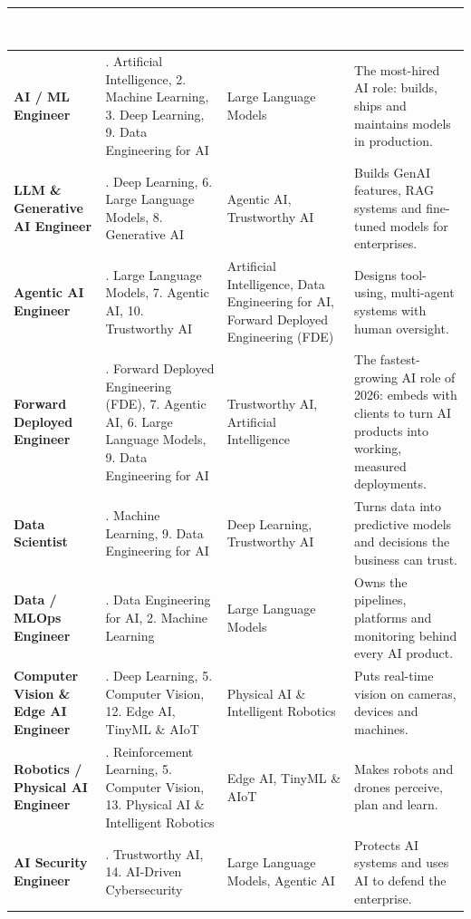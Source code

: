 \documentclass[10pt,a4paper]{article}
\newcommand{\hdr}{\rowcolor{navy}}
\newcommand{\hw}[1]{\textcolor{white}{\bfseries #1}}
\begin{document}
{\small\begin{longtable}{@{}>{\raggedright\arraybackslash}p{3.3cm}>{\raggedright\arraybackslash}p{4.8cm}>{\raggedright\arraybackslash}p{2.8cm}>{\raggedright\arraybackslash}p{4.6cm}@{}}\hdr\hw{Target role}&\hw{Core courses}&\hw{Recommended extras}&\hw{Why it matters}\\\endhead
\textbf{AI / ML Engineer} & 1. Artificial Intelligence, 2. Machine Learning, 3. Deep Learning, 9. Data Engineering for AI & Large Language Models & The most-hired AI role: builds, ships and maintains models in production.\\
\rowcolor{rowbg}\textbf{LLM \& Generative AI Engineer} & 3. Deep Learning, 6. Large Language Models, 8. Generative AI & Agentic AI, Trustworthy AI & Builds GenAI features, RAG systems and fine-tuned models for enterprises.\\
\textbf{Agentic AI Engineer} & 6. Large Language Models, 7. Agentic AI, 10. Trustworthy AI & Artificial Intelligence, Data Engineering for AI, Forward Deployed Engineering (FDE) & Designs tool-using, multi-agent systems with human oversight.\\
\rowcolor{rowbg}\textbf{Forward Deployed Engineer} & 16. Forward Deployed Engineering (FDE), 7. Agentic AI, 6. Large Language Models, 9. Data Engineering for AI & Trustworthy AI, Artificial Intelligence & The fastest-growing AI role of 2026: embeds with clients to turn AI products into working, measured deployments.\\
\textbf{Data Scientist} & 2. Machine Learning, 9. Data Engineering for AI & Deep Learning, Trustworthy AI & Turns data into predictive models and decisions the business can trust.\\
\rowcolor{rowbg}\textbf{Data / MLOps Engineer} & 9. Data Engineering for AI, 2. Machine Learning & Large Language Models & Owns the pipelines, platforms and monitoring behind every AI product.\\
\textbf{Computer Vision \& Edge AI Engineer} & 3. Deep Learning, 5. Computer Vision, 12. Edge AI, TinyML \& AIoT & Physical AI \& Intelligent Robotics & Puts real-time vision on cameras, devices and machines.\\
\rowcolor{rowbg}\textbf{Robotics / Physical AI Engineer} & 4. Reinforcement Learning, 5. Computer Vision, 13. Physical AI \& Intelligent Robotics & Edge AI, TinyML \& AIoT & Makes robots and drones perceive, plan and learn.\\
\textbf{AI Security Engineer} & 10. Trustworthy AI, 14. AI-Driven Cybersecurity & Large Language Models, Agentic AI & Protects AI systems and uses AI to defend the enterprise.\\

\end{longtable}}
\end{document}
